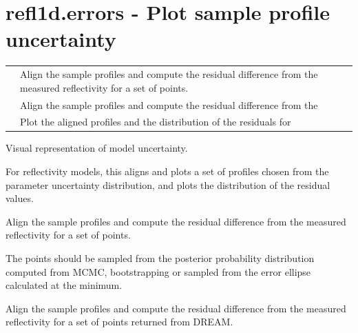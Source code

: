 \documentclass[letterpaper,10pt,english]{sphinxmanual}
\begin{document}
\section{refl1d.errors - Plot sample profile uncertainty}
\label{api/errors::doc}\label{api/errors:refl1d-errors-plot-sample-profile-uncertainty}
\begin{tabulary}{\linewidth}{LL}
\hline

{\hyperref[api/errors:refl1d.errors.calc_distribution]{}}
 & 
Align the sample profiles and compute the residual difference from the measured reflectivity for a set of points.
\\

{\hyperref[api/errors:refl1d.errors.calc_distribution_from_state]{}}
 & 
Align the sample profiles and compute the residual difference from the
\\

{\hyperref[api/errors:refl1d.errors.show_distribution]{}}
 & 
Plot the aligned profiles and the distribution of the residuals for
\\
\hline
\end{tabulary}

\label{api/errors:module-refl1d.errors}
Visual representation of model uncertainty.

For reflectivity models, this aligns and plots a set of profiles chosen
from the parameter uncertainty distribution, and plots the distribution
of the residual values.

\begin{fulllineitems}
\label{api/errors:refl1d.errors.calc_distribution}
Align the sample profiles and compute the residual difference from the
measured reflectivity for a set of points.

The points should be sampled from the posterior probability
distribution computed from MCMC, bootstrapping or sampled from
the error ellipse calculated at the minimum.

\end{fulllineitems}


\begin{fulllineitems}
\label{api/errors:refl1d.errors.calc_distribution_from_state}
Align the sample profiles and compute the residual difference from the
measured reflectivity for a set of points returned from DREAM.

\end{fulllineitems}
\end{document}
